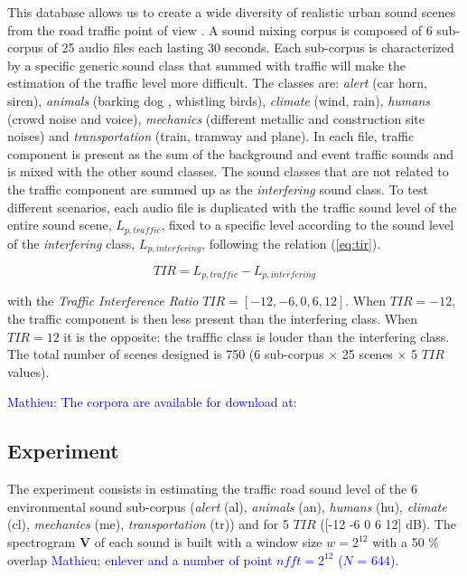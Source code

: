 \documentclass[twocolumn,a4paper,10pt]{article}
\newcommand{\ml}[1]{\textcolor{blue}{ Mathieu: #1}}
\begin{document}
This database allows us to create a wide diversity of realistic urban sound scenes from the road traffic point of view \cite{gloaguen_creation_2017}. A sound mixing corpus is composed of 6 sub-corpus of 25 audio files each lasting 30 seconds. Each sub-corpus is characterized by a specific generic sound class that summed with traffic will make the estimation of the traffic level more difficult. The classes are: \textit{alert} (car horn, siren), \textit{animals} (barking dog , whistling birds), \textit{climate} (wind, rain), \textit{humans} (crowd noise and voice), \textit{mechanics} (different metallic and construction site noises) and \textit{transportation} (train, tramway and plane). In each file, traffic component is present as the sum of the background and event traffic sounds and is mixed with the other sound classes. The sound classes that are not related to the traffic component are summed up as the \textit{interfering} sound class. To test different scenarios, each audio file is duplicated with the traffic sound level of the entire sound scene, $L_{p,traffic}$, fixed to a specific level according to the sound level of the \textit{interfering} class, $L_{p,interfering}$,  following the relation (\ref{eq:tir}).

\begin{equation}\label{eq:tir}
TIR = L_{p,traffic}-L_{p,interfering}
\end{equation}

with the \textit{Traffic Interference Ratio} $TIR = \left[-12, -6, 0, 6, 12\right]$. When $TIR = -12$, the traffic component is then less present than the interfering class. When $TIR = 12$ it is the opposite: the trafffic class is louder than the interfering class. The total number of scenes designed is 750 (6 sub-corpus $\times$ 25 scenes $\times$  5 $TIR$ values).

\ml{The corpora are available for download at: \url{}}

\subsection{Experiment}

The experiment consists in estimating the traffic road sound level of the 6 environmental sound sub-corpus (\textit{alert} (al), \textit{animals} (an), \textit{humans} (hu), \textit{climate} (cl), \textit{mechanics} (me), \textit{transportation} (tr)) and for 5 $TIR$ ([-12 -6 0 6 12] dB). The spectrogram $\mathbf{V}$ of each sound is built with a window size $w = 2^{12}$ with a 50 $\%$ overlap \ml{enlever and a number of point $nfft = 2^{12}$ ($N$ = 644)}.
\end{document}

